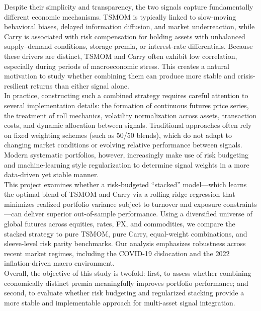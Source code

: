 \documentclass{article}
\begin{document}
Despite their simplicity and transparency, the two signals capture fundamentally different economic
mechanisms. TSMOM is typically linked to slow-moving behavioral biases, delayed information diffusion,
and market underreaction, while Carry is associated with risk compensation for holding assets with
unbalanced supply--demand conditions, storage premia, or interest-rate differentials. Because these drivers
are distinct, TSMOM and Carry often exhibit low correlation, especially during periods of macroeconomic
stress. This creates a natural motivation to study whether combining them can produce more stable and
crisis-resilient returns than either signal alone.\\[0\baselineskip]

In practice, constructing such a combined strategy requires careful attention to several implementation
details: the formation of continuous futures price series, the treatment of roll mechanics, volatility
normalization across assets, transaction costs, and dynamic allocation between signals. Traditional
approaches often rely on fixed weighting schemes (such as 50/50 blends), which do not adapt to changing
market conditions or evolving relative performance between signals. Modern systematic portfolios,
however, increasingly make use of risk budgeting and machine-learning style regularization to determine
signal weights in a more data-driven yet stable manner.\\[0\baselineskip]

This project examines whether a risk-budgeted ``stacked'' model---which learns the optimal blend of
TSMOM and Carry via a rolling ridge regression that minimizes realized portfolio variance subject to
turnover and exposure constraints---can deliver superior out-of-sample performance. Using a diversified
universe of global futures across equities, rates, FX, and commodities, we compare the stacked strategy to
pure TSMOM, pure Carry, equal-weight combinations, and sleeve-level risk parity benchmarks. Our
analysis emphasizes robustness across recent market regimes, including the COVID-19 dislocation and
the 2022 inflation-driven macro environment.\\[0\baselineskip]

Overall, the objective of this study is twofold: first, to assess whether combining economically distinct
premia meaningfully improves portfolio performance; and second, to evaluate whether risk budgeting and
regularized stacking provide a more stable and implementable approach for multi-asset signal integration.
\end{document}
